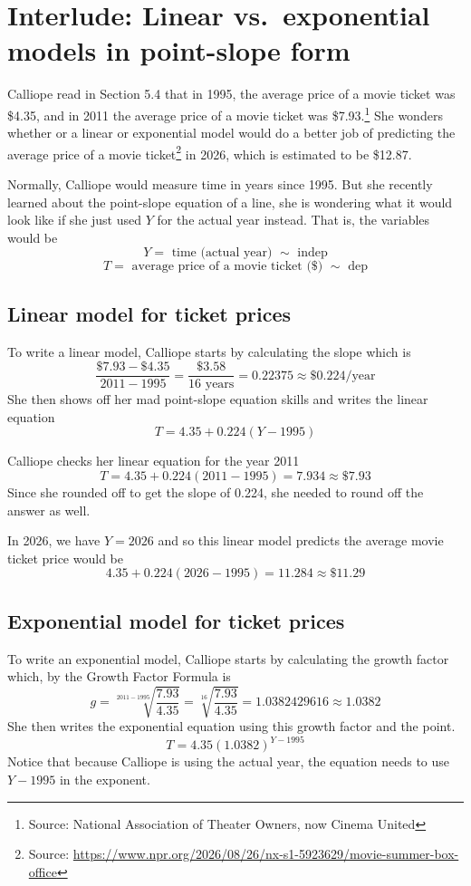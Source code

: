 
\section{Interlude: Linear vs.\ exponential models in point-slope form} 

Calliope read in Section 5.4 %
that in 1995, the average price of a movie ticket was \$4.35, and in 2011 the average price of a movie ticket was \$7.93.\footnote{Source: National Association of Theater Owners, now Cinema United} She wonders whether or a linear or exponential model would do a better job of predicting the average price of a movie ticket\footnote{Source: \url{https://www.npr.org/2026/08/26/nx-s1-5923629/movie-summer-box-office}} in 2026, which is estimated to be \$12.87.

Normally, Calliope would measure time in years since 1995. But she recently learned about the point-slope equation of a line, she is wondering what it would look like if she just used $Y$ for the actual year instead.  That is, the variables would be
$$Y = \text{ time (actual year) } \sim \text{ indep}$$
$$T = \text{ average price of a movie ticket (\$) } \sim \text{ dep}$$

\subsection*{Linear model for ticket prices}

To write a linear model, Calliope starts by calculating the slope which is 
$$\frac{\$7.93-\$4.35}{2011-1995} = \frac{\$3.58}{16 \text{ years}} = 0.22375 \approx \$0.224/\text{year}$$
She then shows off her mad point-slope equation skills and writes the linear equation
$$T = 4.35 + 0.224(Y - 1995)$$

Calliope checks her linear equation for the year 2011
$$T = 4.35 + 0.224(2011 - 1995) = 7.934 \approx \$7.93$$
Since she rounded off to get the slope of 0.224, she needed to round off the answer as well.

In 2026, we have $Y=2026$ and so this linear model predicts the average movie ticket price would be 
$$4.35 + 0.224(2026 - 1995) = 11.284 \approx \$11.29$$

\subsection*{Exponential model for ticket prices}

To write an exponential model, Calliope starts by calculating the growth factor which, by the Growth Factor Formula is
$$g = \sqrt[2011-1995]{\frac{7.93}{4.35}} = \sqrt[16]{\frac{7.93}{4.35}} = 1.0382429616 \approx 1.0382$$
She then writes the exponential equation using this growth factor and the point.
$$T = 4.35(1.0382)^{Y-1995}$$
Notice that because Calliope is using the actual year, the equation needs to use $Y-1995$ in the exponent.

